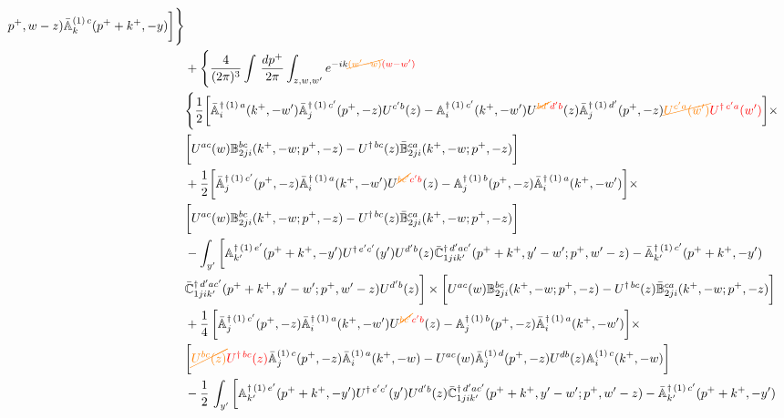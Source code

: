 \documentclass[aps,prd,amsmath,amssymb,nofootinbib]{revtex4-2}
\def\mf#1{\mathbb{#1}}
\numberwithin{equation}{section}
\begin{document}
\begin{align}
p^{+},w-z)\Bar{\mf{A}}^{(1)\,c}_{k}(p^{+}+k^{+},-y)\bigg] \Bigg\}\notag \\ & + \Bigg\{\frac{4}{(2\pi)^{3}} \int\, \frac{dp^{+}}{2\pi}\int_{z,w,w^{\prime}} e^{-ik{\color{orange}\cancel{(w^{\prime}-w)}}{\color{red}(w-w^{\prime})}} \notag \\ & 
        \Bigg\{\frac{1}{2}\bigg[\Bar{\mf{A}}^{\dagger\, (1)\, a}_{i}(k^{+},-w^{\prime})\Bar{\mf{A}}^{\dagger\, (1)\, c^{\prime}}_{j}(p^{+},-z)U^{c^{\prime}b}(z)-\mf{A}^{\dagger\, (1)\, c^{\prime}}_{i}(k^{+},- w^{\prime})U^{{\color{orange}\cancel{bd^{\prime}}}{\color{red}d^{\prime}b}}(z)\Bar{\mf{A}}^{\dagger\, (1)\, d^{\prime}}_{j}(p^{+},-z){\color{orange}\cancel{U^{c^{\prime}a}(w^{\prime})}}{\color{red}U^{\dagger\, c^{\prime}a}(w^{\prime})}  \bigg]\times\notag \\ & \bigg[U^{ac}(w) \mf{B}^{bc}_{2ji}(k^{+},-w;p^{+},-z) -U^{\dagger\, bc}(z)\Bar{\mf{B}}^{ca}_{2ji}(k^{+},-w; p^{+},-z)\bigg]\notag \\ & +\frac{1}{2}\bigg[\Bar{\mf{A}}^{\dagger\,(1)\, c^{\prime}}_{j}(p^{+},-z)\Bar{\mf{A}}^{\dagger\, (1)\, a}_{i}(k^{+},- w^{\prime})U^{{\color{orange}\cancel{bc^{\prime}}}{\color{red}c^{\prime}b}}(z) - \mf{A}^{\dagger\, (1)\, b}_{j}(p^{+},- z)\Bar{\mf{A}}^{\dagger\, (1)\, a}_{i}(k^{+},- w^{\prime})\bigg] \times \notag \\ & \bigg[U^{ac}(w) \mf{B}^{bc}_{2ji}(k^{+},-w;p^{+},-z) -U^{\dagger\, bc}(z)\Bar{\mf{B}}^{ca}_{2ji}(k^{+},-w; p^{+},-z)\bigg]\notag \\ & -\int_{y^{\prime}}\bigg[\mf{A}^{\dagger\, (1)\,e^{\prime}}_{k^{\prime}}(p^{+}+k^{+},-y^{\prime})U^{\dagger\, e^{\prime}c^{\prime}}(y^{\prime})U^{d^{\prime}b}(z) \Bar{\mf{C}}^{\dagger\, d^{\prime}ac^{\prime}}_{1jik^{\prime}}(p^{+}+k^{+},y^{\prime}-w^{\prime}; p^{+},w^{\prime}-z)  -\Bar{\mf{A}}^{\dagger\, (1)\,c^{\prime}}_{k^{\prime}}(p^{+}+k^{+},-y^{\prime})\notag \\ & \Bar{\mf{C}}^{\dagger\, d^{\prime}ac^{\prime}}_{1jik^{\prime}}(p^{+}+k^{+},y^{\prime}-w^{\prime}; p^{+},w^{\prime}-z)U^{d^{\prime}b}(z)\bigg] \times \bigg[U^{ac}(w) \mf{B}^{bc}_{2ji}(k^{+},-w;p^{+},-z) -U^{\dagger\, bc}(z)\Bar{\mf{B}}^{ca}_{2ji}(k^{+},-w; p^{+},-z)\bigg]\notag \\ & +\frac{1}{4}\,\bigg[\Bar{\mf{A}}^{\dagger\,(1)\, c^{\prime}}_{j}(p^{+},-z)\Bar{\mf{A}}^{\dagger\, (1)\, a}_{i}(k^{+},- w^{\prime})U^{{\color{orange}\cancel{bc^{\prime}}}{\color{red}c^{\prime}b}}(z) - \mf{A}^{\dagger\, (1)\, b}_{j}(p^{+},- z)\Bar{\mf{A}}^{\dagger\, (1)\, a}_{i}(k^{+},- w^{\prime})\bigg]\times\notag \\ &  \bigg[{\color{orange}\cancel{U^{bc}(z)}}{\color{red}U^{\dagger\, bc}(z)}\Bar{\mf{A}}^{(1)\, c}_{j}(p^{+},-z)\Bar{\mf{A}}^{(1)\, a}_{i}(k^{+},-w)-U^{ac}(w) \Bar{\mf{A}}^{(1)\, d}_{j}(p^{+},-z)U^{db}(z) \mf{A}^{(1)\, c}_{i}(k^{+},- w)\bigg]\notag \\ & -\frac{1}{2}\, \int_{y^{\prime}}\bigg[\mf{A}^{\dagger\, (1)\,e^{\prime}}_{k^{\prime}}(p^{+}+k^{+},-y^{\prime})U^{\dagger\, e^{\prime}c^{\prime}}(y^{\prime})U^{d^{\prime}b}(z) \Bar{\mf{C}}^{\dagger\, d^{\prime}ac^{\prime}}_{1jik^{\prime}}(p^{+}+k^{+},y^{\prime}-w^{\prime}; p^{+},w^{\prime}-z)  -\Bar{\mf{A}}^{\dagger\, (1)\,c^{\prime}}_{k^{\prime}}(p^{+}+k^{+},-y^{\prime})\notag 
\end{align}
\end{document}
